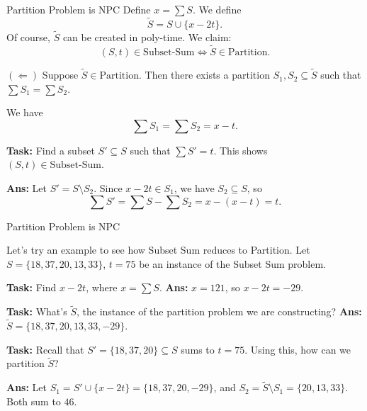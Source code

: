 \documentclass{beamer}
\begin{document}
\begin{frame}{Partition Problem is NPC}
Define $x = \sum S$. We define
$$\tilde{S} = S \cup \{x - 2t\}.$$
Of course, $\tilde{S}$ can be created in poly-time. We claim:
$$(S, t) \in \text{Subset-Sum} \Leftrightarrow \tilde{S} \in \text{Partition}.$$

\pause \vspace{2mm}

$(\Leftarrow)$ Suppose $\tilde{S} \in \text{Partition}$. Then there exists a partition $S_1, S_2 \subseteq \tilde{S}$ such that $\sum S_1 = \sum S_2$.

\vspace{2mm} \pause

We have 
$$\sum S_1 = \sum S_2 = x - t.$$

\pause 

\textbf{Task:} Find a subset $S' \subseteq S$ such that $\sum S' = t$. This shows $(S, t) \in \text{Subset-Sum}$.

\pause

\textbf{Ans:} Let $S' = S \setminus S_2$. Since $x - 2t \in S_1$, we have $S_2 \subseteq S$, so
$$\sum S' = \sum S - \sum S_2 = x - (x - t) = t.$$


\end{frame}

\begin{frame}{Partition Problem is NPC}

Let's try an example to see how Subset Sum reduces to Partition. Let $S = \{18, 37, 20, 13, 33\}$, $t = 75$ be an instance of the Subset Sum problem.

\vspace{2mm} \pause

\textbf{Task:} Find $x - 2t$, where $x = \sum S$.
\pause
\textbf{Ans:} $x = 121$, so $x - 2t = -29$.

\vspace{2mm} \pause

\textbf{Task:} What's $\tilde{S}$, the instance of the partition problem we are constructing?
\pause
\textbf{Ans:} $\tilde{S} = \{18, 37, 20, 13, 33, -29\}$.

\vspace{2mm} \pause

\textbf{Task:} Recall that $S' = \{18, 37, 20\} \subseteq S$ sums to $t = 75$. Using this, how can we partition $\tilde{S}$?

\pause

\textbf{Ans:} Let $S_1 = S' \cup \{x - 2t\}  = \{18, 37, 20, -29\}$, and $S_2 = \tilde{S} \setminus S_1 = \{20, 13, 33\}$. Both sum to $46$.

\end{frame}
\end{document}
